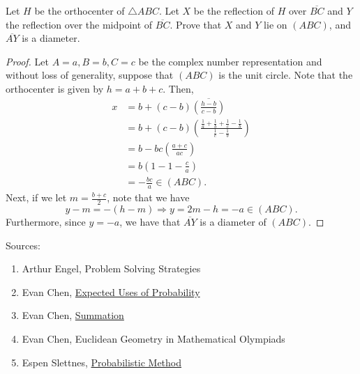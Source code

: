 \documentclass[11pt]{article}
\renewcommand{\>}{\rangle}
\newcommand{\<}{\langle}
\let \ol \overline
\begin{document}
\begin{problem}
Let $H$ be the orthocenter of $\triangle ABC$.  Let $X$ be the reflection of $H$ over $\ol{BC}$ and $Y$ the reflection over the midpoint of $\ol{BC}$.  Prove that $X$ and $Y$ lie on $(ABC)$, and $\ol{AY}$ is a diameter.   
\end{problem}
\begin{proof}
Let $A = a, B = b, C = c$ be the complex number representation and without loss of generality, suppose that $(ABC)$ is the unit circle.  Note that the orthocenter is given by $h = a + b + c$.  Then,
\begin{align*}
x &= b + (c-b) \ol{\left (\frac{h-b}{c-b} \right)} \\
&= b + (c-b) \left (\frac{\frac{1}{a} + \frac{1}{b} + \frac{1}{c}-\frac{1}{b}}  {\frac{1}{c}-\frac{1}{b}} \right) \\
&= b - bc\left(\frac{a+c}{ac} \right) \\
&= b(1 - 1 - \frac{c}{a}) \\
&= -\frac{bc}{a} \in (ABC).
\end{align*}
Next, if we let $m = \frac{b+c}{2}$, note that we have 
$$y-m = -(h-m) \Rightarrow y = 2m - h = -a \in (ABC).$$
Furthermore, since $y = -a$, we have that $\ol{AY}$ is a diameter of $(ABC)$.
\end{proof}

\pagebreak
Sources:
\begin{enumerate}
\item Arthur Engel, Problem Solving Strategies
\item Evan Chen, \href{https://web.evanchen.cc/handouts/ProbabilisticMethod/ProbabilisticMethod.pdf}{Expected Uses of Probability}
\item Evan Chen, \href{https://web.evanchen.cc/handouts/Summation/Summation.pdf}{Summation}
\item Evan Chen, Euclidean Geometry in Mathematical Olympiads
\item Espen Slettnes, \href{https://mathcircle.berkeley.edu/sites/default/files/handouts/2019/Probabilistic_Method_Espen_Slettnes_0.pdf}{Probabilistic Method} 
\end{enumerate}

 
\end{document}
